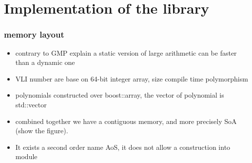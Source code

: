 \documentclass[oribibl]{llncs2e/llncs}
\begin{document}



\section{Implementation of the library}
\subsubsection{memory layout}
\begin{itemize}
\item contrary to GMP  explain a static version of large arithmetic can be faster than a dynamic one
\item   VLI number are base on 64-bit integer array, size compile time polymorphism 
\item  polynomials constructed over boost::array, the vector of polynomial is std::vector
\item combined together we have a contiguous memory, and more precisely  SoA (show the figure). 
\item  It exists a second order name AoS, it does not allow a construction into module 
\end{itemize}
\end{document}
